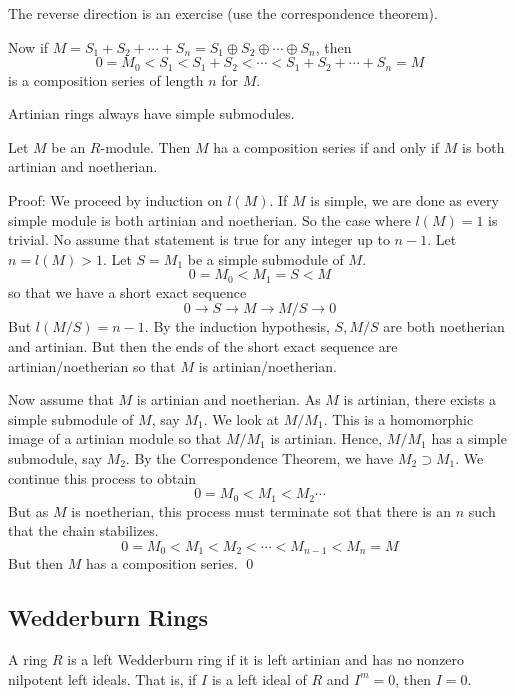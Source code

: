 The reverse direction is an exercise (use the correspondence theorem). 

Now if $M=S_1+S_2+\cdots+S_n=S_1\oplus S_2 \oplus \cdots \oplus S_n$, then
\[
0=M_0<S_1<S_1+S_2<\cdots<S_1+S_2+\cdots+S_n=M
\] 
is a composition series of length $n$ for $M$. 

\begin{rem}
Artinian rings always have simple submodules. 
\end{rem}

\begin{thm}
Let $M$ be an $R$-module. Then $M$ ha a composition series if and only if $M$ is both artinian and noetherian. 
\end{thm}

Proof: We proceed by induction on $l(M)$. If $M$ is simple, we are done as every simple module is both artinian and noetherian. So the case where $l(M)=1$ is trivial. No assume that statement is true for any integer up to $n-1$. Let $n=l(M)>1$. Let $S=M_1$ be a simple submodule of $M$. 
\[
0=M_0 <M_1=S<M
\]
so that we have a short exact sequence
\[
0 \longrightarrow S \longrightarrow M \longrightarrow M/S \longrightarrow 0
\]
But $l(M/S)=n-1$. By the induction hypothesis, $S,M/S$ are both noetherian and artinian. But then the ends of the short exact sequence are artinian/noetherian so that $M$ is artinian/noetherian. 

Now assume that $M$ is artinian and noetherian. As $M$ is artinian, there exists a simple submodule of $M$, say $M_1$. We look at $M/M_1$. This is a homomorphic image of a artinian module so that $M/M_1$ is artinian. Hence, $M/M_1$ has a simple submodule, say $M_2$. By the Correspondence Theorem, we have $M_2 \supset M_1$. We continue this process to obtain
\[
0=M_0<M_1<M_2\cdots
\]
But as $M$ is noetherian, this process must terminate sot that there is an $n$ such that the chain stabilizes. 
\[
0=M_0<M_1<M_2<\cdots<M_{n-1}<M_n=M
\]
But then $M$ has a composition series. \qed \\

\subsection{Wedderburn Rings}

\begin{dfn}
A ring $R$ is a left Wedderburn ring if it is left artinian and has no nonzero nilpotent left ideals. That is, if $I$ is a left ideal of $R$ and $I^m=0$, then $I=0$.
\end{dfn}

